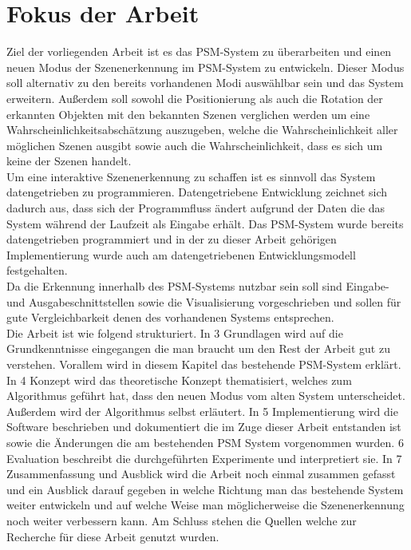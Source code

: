 \section{Fokus der Arbeit}
Ziel der vorliegenden Arbeit ist es das PSM-System zu überarbeiten und einen neuen Modus der Szenenerkennung im PSM-System zu entwickeln. Dieser Modus soll alternativ zu den bereits vorhandenen Modi auswählbar sein und das System erweitern. Außerdem soll sowohl die Positionierung als auch die Rotation der erkannten Objekten mit den bekannten Szenen verglichen werden um eine Wahrscheinlichkeitsabschätzung auszugeben, welche die Wahrscheinlichkeit aller möglichen Szenen ausgibt sowie auch die Wahrscheinlichkeit, dass es sich um keine der Szenen  handelt.\smallskip\\
Um eine interaktive Szenenerkennung zu schaffen ist es sinnvoll das System datengetrieben zu programmieren. Datengetriebene Entwicklung zeichnet sich dadurch aus, dass sich der Programmfluss ändert aufgrund der Daten die das System während der Laufzeit als Eingabe erhält. Das PSM-System wurde bereits datengetrieben programmiert und in der zu dieser Arbeit gehörigen Implementierung wurde auch am datengetriebenen Entwicklungsmodell festgehalten.\smallskip\\ 
Da die Erkennung innerhalb des PSM-Systems nutzbar sein soll sind Eingabe- und Ausgabeschnittstellen sowie die Visualisierung vorgeschrieben und sollen für gute Vergleichbarkeit denen des vorhandenen Systems entsprechen.\smallskip\\
Die Arbeit ist wie folgend strukturiert. In 3 Grundlagen wird auf die Grundkenntnisse eingegangen die man braucht um den Rest der Arbeit gut zu verstehen. Vorallem wird in diesem Kapitel das bestehende PSM-System erklärt. In 4 Konzept wird das theoretische Konzept thematisiert, welches zum Algorithmus geführt hat, dass den neuen Modus vom alten System unterscheidet. Außerdem wird der Algorithmus selbst erläutert. In 5 Implementierung wird die Software beschrieben und dokumentiert die im Zuge dieser Arbeit entstanden ist sowie die Änderungen die am bestehenden PSM System vorgenommen wurden. 6 Evaluation beschreibt die durchgeführten Experimente und interpretiert sie. In 7 Zusammenfassung und Ausblick wird die Arbeit noch einmal zusammen gefasst und ein Ausblick darauf gegeben in welche Richtung man das bestehende System weiter entwickeln und auf welche Weise man  möglicherweise die Szenenerkennung noch weiter verbessern kann. Am Schluss stehen die Quellen welche zur Recherche für diese Arbeit genutzt wurden.

